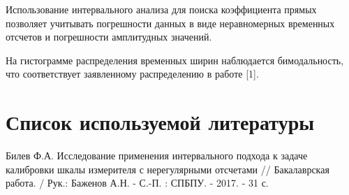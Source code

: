 \documentclass[12pt,a4paper]{article}
\begin{document}
Использование интервального анализа для поиска коэффициента прямых позволяет учитывать погрешности данных в виде неравномерных временных отсчетов и погрешности амплитудных значений.

На гистограмме распределения временных ширин наблюдается бимодальность, что соответствует заявленному распределению в работе [1].

\section{Список используемой литературы}
\begin{thebibliography}{1}
Билев Ф.А. Исследование применения интервального подхода к задаче калибровки шкалы измерителя с нерегулярными отсчетами // Бакалаврская работа. / Рук.: Баженов А.Н. - С.-П. : СПБПУ. - 2017. - 31 с.
\end{thebibliography}
\end{document}
